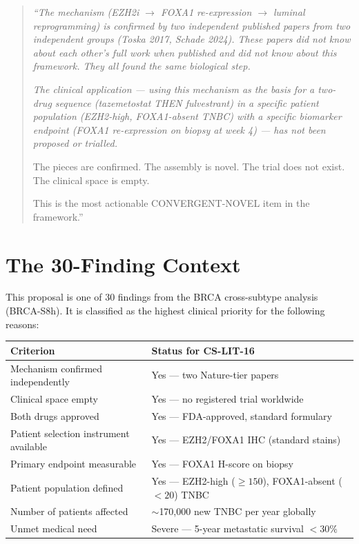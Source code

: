 \documentclass[12pt, a4paper]{article}
\begin{document}
\begin{quote}
\itshape
``The mechanism (EZH2i $\rightarrow$ FOXA1
re-expression $\rightarrow$ luminal reprogramming)
is confirmed by two independent published papers
from two independent groups (Toska 2017, Schade 2024).
These papers did not know about each other's full work
when published and did not know about this framework.
They all found the same biological step.

\upshape\itshape
The clinical application --- using this mechanism as
the basis for a two-drug sequence (tazemetostat THEN
fulvestrant) in a specific patient population
(EZH2-high, FOXA1-absent TNBC) with a specific
biomarker endpoint (FOXA1 re-expression on biopsy
at week 4) --- has not been proposed or trialled.

The pieces are confirmed. The assembly is novel.
The trial does not exist. The clinical space is empty.

This is the most actionable CONVERGENT-NOVEL item
in the framework.''
\upshape
\end{quote}

\section{The 30-Finding Context}

This proposal is one of 30 findings from the BRCA
cross-subtype analysis (BRCA-S8h). It is classified
as the highest clinical priority for the following
reasons:

\begin{center}
\begin{tabular}{p{5cm}p{8cm}}
\toprule
\textbf{Criterion} & \textbf{Status for CS-LIT-16} \\
\midrule
Mechanism confirmed independently
& Yes --- two Nature-tier papers \\
Clinical space empty
& Yes --- no registered trial worldwide \\
Both drugs approved
& Yes --- FDA-approved, standard formulary \\
Patient selection instrument available
& Yes --- EZH2/FOXA1 IHC (standard stains) \\
Primary endpoint measurable
& Yes --- FOXA1 H-score on biopsy \\
Patient population defined
& Yes --- EZH2-high ($\geq150$),
  FOXA1-absent ($<20$) TNBC \\
Number of patients affected
& $\sim$170,000 new TNBC per year globally \\
Unmet medical need
& Severe --- 5-year metastatic survival $<30\%$ \\
\bottomrule
\end{tabular}
\end{center}
\end{document}
